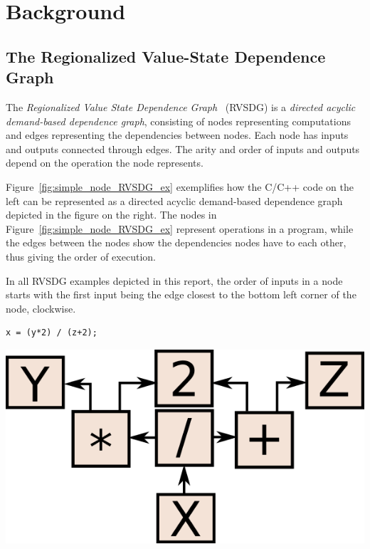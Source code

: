 
\clearpage
\section{Background}
\label{background}

\subsection{The Regionalized Value-State Dependence Graph}
\label{background:RVSDG}

The \textit{Regionalized Value State Dependence Graph}~\cite{RVSDG:HiPEACpaper}
(RVSDG) is a \textit{directed acyclic demand-based dependence graph},
consisting of nodes representing computations and edges representing the
dependencies between nodes. Each node has inputs and outputs connected through
edges. The arity and order of inputs and outputs depend on the operation the
node represents.

Figure~\ref{fig:simple_node_RVSDG_ex} exemplifies how the C/C++ code on the left
can be represented as a directed acyclic demand-based dependence graph depicted
in the figure on the right. The nodes in Figure~\ref{fig:simple_node_RVSDG_ex}
represent operations in a program, while the edges between the nodes show the
dependencies nodes have to each other, thus giving the order of execution.

In all RVSDG examples depicted in this report, the order of inputs in a node
starts with the first input being the edge closest to the bottom left corner of
the node, clockwise.

\begin{centering}
	\noindent\begin{minipage}{0.36\textwidth}
		\begin{CenteredBox}
		\begin{lstlisting}[label={lst:simple_node_RVSDG_ex},
style=minipage_customcpp, basicstyle=\fontsize{10}{1}]
x = (y*2) / (z+2);
		\end{lstlisting}
		\end{CenteredBox}
	\end{minipage}
	\noindent\begin{minipage}{0.55\textwidth}
		\captionsetup{type=figure}
		\includegraphics[width=\textwidth]{figures/simple_node_RVSDG_ex}
	\end{minipage}
	\label{fig:simple_node_RVSDG_ex}
\end{centering}

